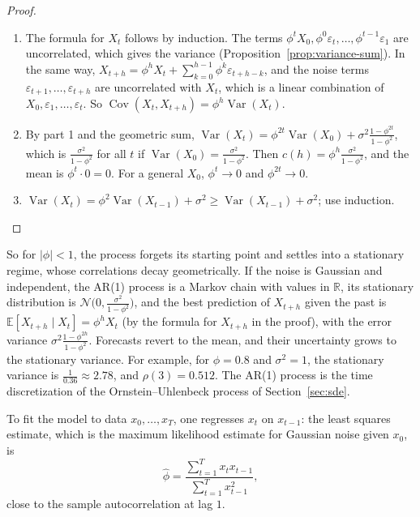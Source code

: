 \documentclass[11pt]{article}
\newcommand{\E}{\mathbb{E}}
\DeclareMathOperator{\Var}{Var}
\DeclareMathOperator{\Cov}{Cov}
\theoremstyle{definition}
\theoremstyle{plain}
\theoremstyle{remark}
\begin{document}
\begin{proof}
    \begin{enumerate}
        \item The formula for $X_t$ follows by induction. The terms $\phi^tX_0, \phi^0\varepsilon_t, \ldots, \phi^{t-1}\varepsilon_1$ are uncorrelated, which gives the variance (Proposition~\ref{prop:variance-sum}). In the same way, $X_{t+h} = \phi^hX_t + \sum_{k=0}^{h-1}\phi^k\varepsilon_{t+h-k}$, and the noise terms $\varepsilon_{t+1}, \ldots, \varepsilon_{t+h}$ are uncorrelated with $X_t$, which is a linear combination of $X_0, \varepsilon_1, \ldots, \varepsilon_t$. So $\Cov(X_t, X_{t+h}) = \phi^h\Var(X_t)$.
        \item By part 1 and the geometric sum, $\Var(X_t) = \phi^{2t}\Var(X_0) + \sigma^2\frac{1 - \phi^{2t}}{1 - \phi^2}$, which is $\frac{\sigma^2}{1 - \phi^2}$ for all $t$ if $\Var(X_0) = \frac{\sigma^2}{1 - \phi^2}$. Then $c(h) = \phi^h\frac{\sigma^2}{1 - \phi^2}$, and the mean is $\phi^t \cdot 0 = 0$. For a general $X_0$, $\phi^t \to 0$ and $\phi^{2t} \to 0$.
        \item $\Var(X_t) = \phi^2\Var(X_{t-1}) + \sigma^2 \geq \Var(X_{t-1}) + \sigma^2$; use induction. \qedhere
    \end{enumerate}
\end{proof}

So for $|\phi| < 1$, the process forgets its starting point and settles into a stationary regime, whose correlations decay geometrically. If the noise is Gaussian and independent, the AR(1) process is a Markov chain with values in $\mathbb{R}$, its stationary distribution is $\mathcal{N}\big(0, \frac{\sigma^2}{1 - \phi^2}\big)$, and the best prediction of $X_{t+h}$ given the past is $\E[X_{t+h} \mid X_t] = \phi^hX_t$ (by the formula for $X_{t+h}$ in the proof), with the error variance $\sigma^2\frac{1 - \phi^{2h}}{1 - \phi^2}$. Forecasts revert to the mean, and their uncertainty grows to the stationary variance. For example, for $\phi = 0.8$ and $\sigma^2 = 1$, the stationary variance is $\frac{1}{0.36} \approx 2.78$, and $\rho(3) = 0.512$. The AR(1) process is the time discretization of the Ornstein--Uhlenbeck process of Section~\ref{sec:sde}.

To fit the model to data $x_0, \ldots, x_T$, one regresses $x_t$ on $x_{t-1}$: the least squares estimate, which is the maximum likelihood estimate for Gaussian noise given $x_0$, is
\[\hat\phi = \frac{\sum_{t=1}^T x_tx_{t-1}}{\sum_{t=1}^T x_{t-1}^2},\]
close to the sample autocorrelation at lag $1$.
\end{document}
